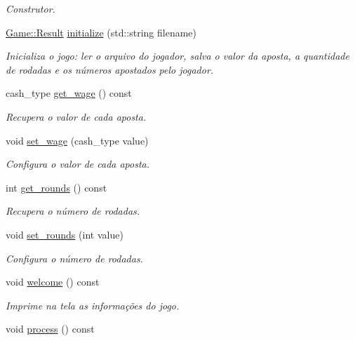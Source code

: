 \begin{DoxyCompactItemize}
\begin{DoxyCompactList}\small\item\em Construtor. \end{DoxyCompactList}\item 
\hyperlink{structGame_1_1Result}{Game\+::\+Result} \hyperlink{classKeno_1_1KenoManager_adb205feb03694fcc9f3e8712807b4fc8}{initialize} (std\+::string filename)
\begin{DoxyCompactList}\small\item\em Inicializa o jogo\+: ler o arquivo do jogador, salva o valor da aposta, a quantidade de rodadas e os números apostados pelo jogador. \end{DoxyCompactList}\item 
cash\+\_\+type \hyperlink{classKeno_1_1KenoManager_a9100bf8ddea1369a5323d5752ab12469}{get\+\_\+wage} () const 
\begin{DoxyCompactList}\small\item\em Recupera o valor de cada aposta. \end{DoxyCompactList}\item 
void \hyperlink{classKeno_1_1KenoManager_a35b8f9422b2803dda5a07f81568795b6}{set\+\_\+wage} (cash\+\_\+type value)
\begin{DoxyCompactList}\small\item\em Configura o valor de cada aposta. \end{DoxyCompactList}\item 
int \hyperlink{classKeno_1_1KenoManager_a8cd4d9b68c1bcb6b00c67d50c95387dc}{get\+\_\+rounds} () const 
\begin{DoxyCompactList}\small\item\em Recupera o número de rodadas. \end{DoxyCompactList}\item 
void \hyperlink{classKeno_1_1KenoManager_afe6d316aa510b48214260942c24499d1}{set\+\_\+rounds} (int value)
\begin{DoxyCompactList}\small\item\em Configura o número de rodadas. \end{DoxyCompactList}\item 
void \hyperlink{classKeno_1_1KenoManager_a6f93a3995a02f7878a5ac8c04c552025}{welcome} () const 
\begin{DoxyCompactList}\small\item\em Imprime na tela as informações do jogo. \end{DoxyCompactList}\item 
void \hyperlink{classKeno_1_1KenoManager_a252e5b14aac7f6394729159ee2336bfb}{process} () const \hypertarget{classKeno_1_1KenoManager_a252e5b14aac7f6394729159ee2336bfb}{}\label{classKeno_1_1KenoManager_a252e5b14aac7f6394729159ee2336bfb}


\end{DoxyCompactItemize}
